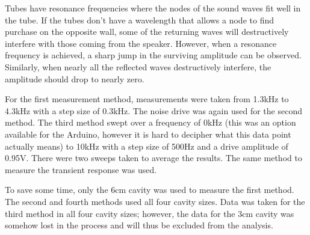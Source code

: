 \documentclass[12pt]{article}
\begin{document}
Tubes have resonance frequencies where the nodes of the sound waves fit well in the tube. If the tubes don't have a wavelength that allows a node to find purchase on the opposite wall, some of the returning waves will destructively interfere with those coming from the speaker. However, when a resonance frequency is achieved, a sharp jump in the surviving amplitude can be observed. Similarly, when nearly all the reflected waves destructively interfere, the amplitude should drop to nearly zero. 
    
For the first measurement method, measurements were taken from 1.3kHz to 4.3kHz with a step size of 0.3kHz. The noise drive was again used for the second method. The third method swept over a frequency of 0kHz (this was an option available for the Arduino, however it is hard to decipher what this data point actually means) to 10kHz with a step size of 500Hz and a drive amplitude of 0.95V. There were two sweeps taken to average the results. The same method to measure the transient response was used. 
    
To save some time, only the 6cm cavity was used to measure the first method. The second and fourth methods used all four cavity sizes. Data was taken for the third method in all four cavity sizes; however, the data for the 3cm cavity was somehow lost in the process and will thus be excluded from the analysis.
    
\end{document}
